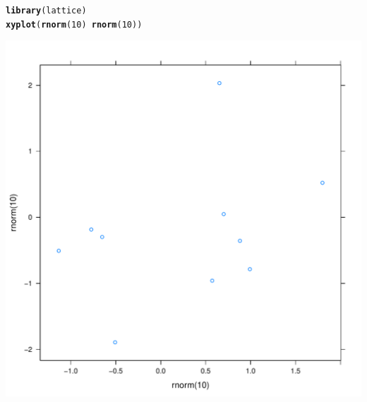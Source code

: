 \documentclass{article}\usepackage{graphicx, color}
\makeatletter
\def\maxwidth{ %
  \ifdim\Gin@nat@width>\linewidth
    \linewidth
  \else
    \Gin@nat@width
  \fi
}
\newcommand{\hlfunctioncall}[1]{\textcolor[rgb]{0.501960784313725,0,0.329411764705882}{\textbf{#1}}}%
\newenvironment{kframe}{%
 \def\at@end@of@kframe{}%
 \ifinner\ifhmode%
  \def\at@end@of@kframe{\end{minipage}}%
  \begin{minipage}{\columnwidth}%
 \fi\fi%
 \def\FrameCommand##1{\hskip\@totalleftmargin \hskip-\fboxsep
 \colorbox{shadecolor}{##1}\hskip-\fboxsep
     \hskip-\linewidth \hskip-\@totalleftmargin \hskip\columnwidth}%
 \MakeFramed {\advance\hsize-\width
   \@totalleftmargin\z@ \linewidth\hsize
   \@setminipage}}%
 {\par\unskip\endMakeFramed%
 \at@end@of@kframe}
\newenvironment{knitrout}{}{} %
\makeatother
\begin{document}
\begin{knitrout}
\color{fgcolor}\begin{kframe}
\begin{alltt}
\hlfunctioncall{library}(lattice)
\hlfunctioncall{xyplot}(\hlfunctioncall{rnorm}(10) ~ \hlfunctioncall{rnorm}(10))
\end{alltt}
\end{kframe}\includegraphics[width=\maxwidth]{figure/Show-off} 
\end{knitrout}
\end{document}
